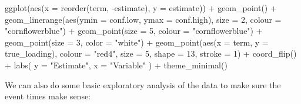 \documentclass[
  letterpaper,
  DIV=11,
  numbers=noendperiod]{scrreprt}
\newenvironment{Shaded}{\begin{snugshade}}{\end{snugshade}}
\newcommand{\AttributeTok}[1]{\textcolor[rgb]{0.40,0.45,0.13}{#1}}
\newcommand{\DecValTok}[1]{\textcolor[rgb]{0.68,0.00,0.00}{#1}}
\newcommand{\FunctionTok}[1]{\textcolor[rgb]{0.28,0.35,0.67}{#1}}
\newcommand{\NormalTok}[1]{\textcolor[rgb]{0.00,0.23,0.31}{#1}}
\newcommand{\SpecialCharTok}[1]{\textcolor[rgb]{0.37,0.37,0.37}{#1}}
\newcommand{\StringTok}[1]{\textcolor[rgb]{0.13,0.47,0.30}{#1}}
\begin{document}
\begin{Shaded}
\begin{Highlighting}[]
  \FunctionTok{ggplot}\NormalTok{(}\FunctionTok{aes}\NormalTok{(}\AttributeTok{x =} \FunctionTok{reorder}\NormalTok{(term, }\SpecialCharTok{{-}}\NormalTok{estimate), }\AttributeTok{y =}\NormalTok{ estimate)) }\SpecialCharTok{+}
    \FunctionTok{geom\_point}\NormalTok{() }\SpecialCharTok{+}
    \FunctionTok{geom\_linerange}\NormalTok{(}\FunctionTok{aes}\NormalTok{(}\AttributeTok{ymin =}\NormalTok{ conf.low, }\AttributeTok{ymax =}\NormalTok{ conf.high), }\AttributeTok{size =} \DecValTok{2}\NormalTok{, }\AttributeTok{colour =}   \StringTok{"cornflowerblue"}\NormalTok{) }\SpecialCharTok{+}
    \FunctionTok{geom\_point}\NormalTok{(}\AttributeTok{size =} \DecValTok{5}\NormalTok{, }\AttributeTok{colour =} \StringTok{"cornflowerblue"}\NormalTok{) }\SpecialCharTok{+}
    \FunctionTok{geom\_point}\NormalTok{(}\AttributeTok{size =} \DecValTok{3}\NormalTok{, }\AttributeTok{color =} \StringTok{"white"}\NormalTok{) }\SpecialCharTok{+}
    \FunctionTok{geom\_point}\NormalTok{(}\FunctionTok{aes}\NormalTok{(}\AttributeTok{x =}\NormalTok{ term, }\AttributeTok{y =}\NormalTok{ true\_loading), }\AttributeTok{colour =} \StringTok{"red4"}\NormalTok{, }\AttributeTok{size =} \DecValTok{5}\NormalTok{, }\AttributeTok{shape =}  \DecValTok{13}\NormalTok{, }\AttributeTok{stroke =} \DecValTok{1}\NormalTok{) }\SpecialCharTok{+}
    \FunctionTok{coord\_flip}\NormalTok{() }\SpecialCharTok{+} 
    \FunctionTok{labs}\NormalTok{(}
      \AttributeTok{y =} \StringTok{"Estimate"}\NormalTok{,}
      \AttributeTok{x =} \StringTok{"Variable"}
\NormalTok{    ) }\SpecialCharTok{+}
    \FunctionTok{theme\_minimal}\NormalTok{() }
\end{Highlighting}
\end{Shaded}

We can also do some basic exploratory analysis of the data to make sure
the event times make sense:
\end{document}
